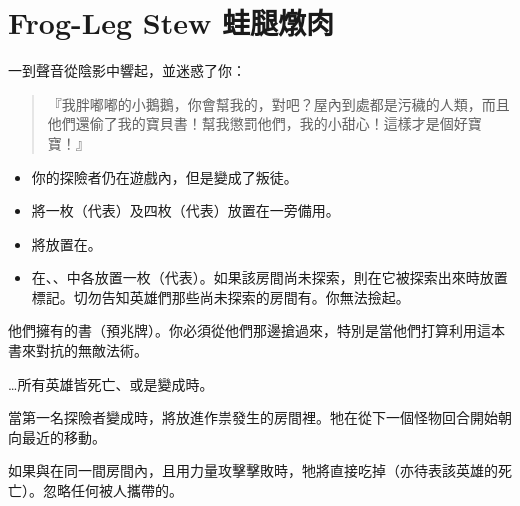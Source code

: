 
\chapter{Frog-Leg Stew 蛙腿燉肉}

\begin{HauntStory}
  一到聲音從陰影中響起，並迷惑了你：
  \begin{quote}
    『我胖嘟嘟的小鵝鵝，你會幫我的，對吧？屋內到處都是污穢的人類，而且他們還偷了我的寶貝書！幫我懲罰他們，我的小甜心！這樣才是個好寶寶！』
  \end{quote}
\end{HauntStory}

\vspace*{-1em}
\begin{itemize}
  \item 你的探險者仍在遊戲內，但是變成了叛徒。
  \item 將一枚（代表）及四枚（代表）放置在一旁備用。
  \item 將放置在。
  \item 在、、中各放置一枚（代表）。如果該房間尚未探索，則在它被探索出來時放置標記。切勿告知英雄們那些尚未探索的房間有。你無法撿起。
\end{itemize}

他們擁有的書（預兆牌）。你必須從他們那邊搶過來，特別是當他們打算利用這本書來對抗的無敵法術。

…所有英雄皆死亡、或是變成時。

當第一名探險者變成時，將放進作祟發生的房間裡。牠在從下一個怪物回合開始朝向最近的移動。

如果與在同一間房間內，且用力量攻擊擊敗時，牠將直接吃掉（亦待表該英雄的死亡）。忽略任何被人攜帶的。

\vfill\null\pagebreak



